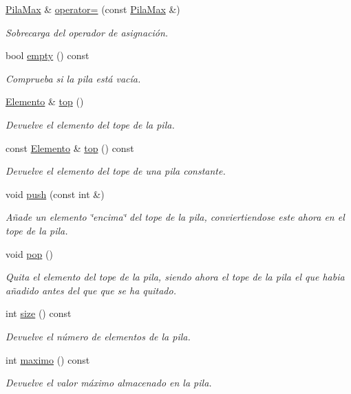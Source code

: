 \begin{DoxyCompactItemize}
\hyperlink{classPilaMax}{Pila\+Max} \& \hyperlink{classPilaMax_aea02040ccd829163ee20c7ec6faeb887}{operator=} (const \hyperlink{classPilaMax}{Pila\+Max} \&)
\begin{DoxyCompactList}\small\item\em Sobrecarga del operador de asignación. \end{DoxyCompactList}\item 
bool \hyperlink{classPilaMax_ab31ac009a1c761470cf3cac634396694}{empty} () const
\begin{DoxyCompactList}\small\item\em Comprueba si la pila está vacía. \end{DoxyCompactList}\item 
\hyperlink{structElemento}{Elemento} \& \hyperlink{classPilaMax_a454bac8dc912314714a683c66b23fb86}{top} ()
\begin{DoxyCompactList}\small\item\em Devuelve el elemento del tope de la pila. \end{DoxyCompactList}\item 
const \hyperlink{structElemento}{Elemento} \& \hyperlink{classPilaMax_afeb131b02d413303ff5740aecd730969}{top} () const
\begin{DoxyCompactList}\small\item\em Devuelve el elemento del tope de una pila constante. \end{DoxyCompactList}\item 
void \hyperlink{classPilaMax_a68d85126d08a5a73bce655390e5bf2d7}{push} (const int \&)
\begin{DoxyCompactList}\small\item\em Añade un elemento \char`\"{}encima\char`\"{} del tope de la pila, conviertiendose este ahora en el tope de la pila. \end{DoxyCompactList}\item 
void \hyperlink{classPilaMax_ac728a5593dbd9acb5d400f416e680736}{pop} ()
\begin{DoxyCompactList}\small\item\em Quita el elemento del tope de la pila, siendo ahora el tope de la pila el que habia añadido antes del que que se ha quitado. \end{DoxyCompactList}\item 
int \hyperlink{classPilaMax_ab920daacfaac5fceda9aa9b1b28b869a}{size} () const
\begin{DoxyCompactList}\small\item\em Devuelve el número de elementos de la pila. \end{DoxyCompactList}\item 
int \hyperlink{classPilaMax_aeed1b737e5130f0d281b90303e1cf9bd}{maximo} () const
\begin{DoxyCompactList}\small\item\em Devuelve el valor máximo almacenado en la pila. \end{DoxyCompactList}\end{DoxyCompactItemize}


